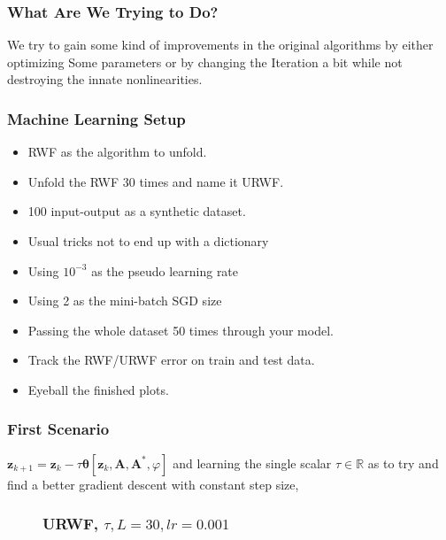\begin{frame}
    \frametitle{What Are We Trying to Do?}
    \begin{center}
      \Large{We try to gain some kind of improvements in the original algorithms by either optimizing Some parameters
      or by changing the Iteration a bit while not destroying the innate nonlinearities.}  
    \end{center}
\end{frame}

\begin{frame}
  \frametitle{Machine Learning Setup}
  \begin{itemize}
    \pause
    \item RWF as the algorithm to unfold.
    \pause
    \item Unfold the RWF 30 times and name it URWF.
    \pause
    \item 100 input-output as a synthetic dataset.
    \pause 
    \item Usual tricks not to end up with a dictionary
    \pause 
    \item Using $10^{-3}$ as the pseudo learning rate
    \pause 
    \item Using 2 as the mini-batch SGD size
    \pause 
    \item Passing the whole dataset 50 times through your model.
    \pause 
    \item Track the RWF/URWF error on train and test data. 
    \pause 
    \item Eyeball the finished plots.
  \end{itemize}
\end{frame}

\begin{frame}
    \frametitle{First Scenario}
    \begin{center}
      $\boldsymbol{z}_{k+1} = \boldsymbol{z}_k - \tau\boldsymbol{\theta}[\boldsymbol{z}_k,\boldsymbol{A},\boldsymbol{A^*},\varphi]$ 
      and learning the single scalar $\tau \in \mathbb{R}$ as to try and find a better gradient descent with constant step size,  
    \end{center}    
\end{frame}

\begin{frame}
  \begin{figure}
    \frametitle{URWF, $\tau,L=30,lr=0.001$}
    \centering
    \resizebox{0.9\textwidth}{!}{}
    \label{fig:rwf_s_00_l_30_lr_0.001}
  \end{figure}
\end{frame}

